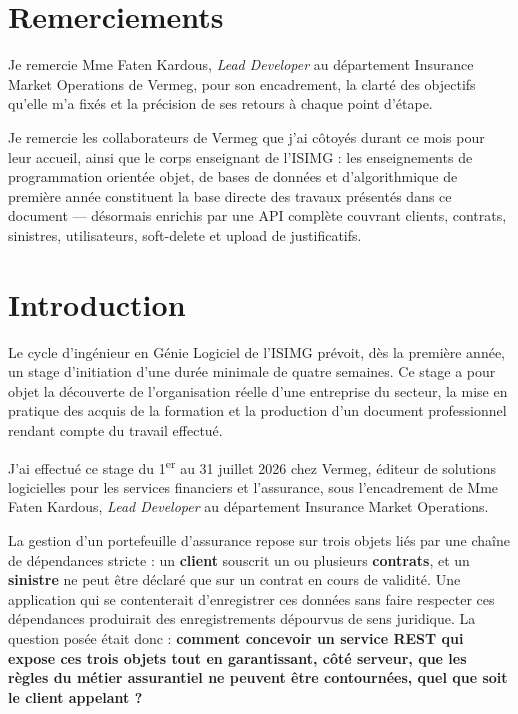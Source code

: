 \documentclass[a4paper,12pt]{article}
\begin{document}
\section*{Remerciements}
\markboth{}{}
Je remercie Mme Faten Kardous, \emph{Lead Developer} au département Insurance Market Operations de Vermeg, pour son encadrement, la clarté des objectifs qu'elle m'a fixés et la précision de ses retours à chaque point d'étape.

Je remercie les collaborateurs de Vermeg que j'ai côtoyés durant ce mois pour leur accueil, ainsi que le corps enseignant de l'ISIMG : les enseignements de programmation orientée objet, de bases de données et d'algorithmique de première année constituent la base directe des travaux présentés dans ce document — désormais enrichis par une API complète couvrant clients, contrats, sinistres, utilisateurs, soft-delete et upload de justificatifs.

\vspace{\fill}
\newpage
\renewcommand{\contentsname}{Sommaire}
\tableofcontents
\newpage
\renewcommand{\listfigurename}{Liste des figures}
\listoffigures
{}
\vspace{16pt}
\renewcommand{\listtablename}{Liste des tableaux}
\listoftables
{}
\newpage

\setcounter{page}{1}

\section*{Introduction}
Le cycle d'ingénieur en Génie Logiciel de l'ISIMG prévoit, dès la première année, un stage d'initiation d'une durée minimale de quatre semaines. Ce stage a pour objet la découverte de l'organisation réelle d'une entreprise du secteur, la mise en pratique des acquis de la formation et la production d'un document professionnel rendant compte du travail effectué.

J'ai effectué ce stage du 1\textsuperscript{er} au 31 juillet 2026 chez Vermeg, éditeur de solutions logicielles pour les services financiers et l'assurance, sous l'encadrement de Mme Faten Kardous, \emph{Lead Developer} au département Insurance Market Operations.

La gestion d'un portefeuille d'assurance repose sur trois objets liés par une chaîne de dépendances stricte : un \textbf{client} souscrit un ou plusieurs \textbf{contrats}, et un \textbf{sinistre} ne peut être déclaré que sur un contrat en cours de validité. Une application qui se contenterait d'enregistrer ces données sans faire respecter ces dépendances produirait des enregistrements dépourvus de sens juridique. La question posée était donc : \textbf{comment concevoir un service REST qui expose ces trois objets tout en garantissant, côté serveur, que les règles du métier assurantiel ne peuvent être contournées, quel que soit le client appelant ?}
\end{document}
